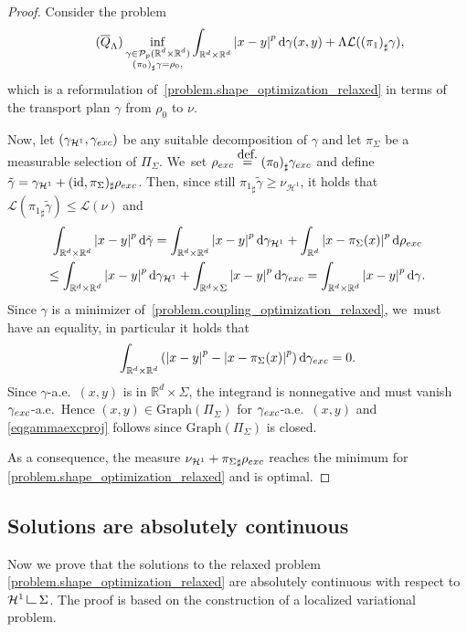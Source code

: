 \documentclass[11pt]{article}
\numberwithin{equation}{section}
\theoremstyle{definition}
\newcommand{\eqdef}{\ensuremath{\stackrel{\mbox{\upshape\tiny def.}}{=}}}
\newcommand\LM[1]{\hbox{\vrule width.5pt \vbox to#1pt{\vfill \hrule width#1pt height.5pt}}}
\newcommand\LL{{\mathchoice {\>\LM7\>}{\>\LM7\>}{\,\LM5\,}{\,\LM{3.35}\,}}}
\newcommand{\mres}{\LL}
\newcommand\cH{\mathcal{H}}
\newcommand{\RR}{\mathbb{R}}
\newcommand{\nuH}{\nu_{\cH^1}}
\newcommand{\rhoexc}{\rho_{\textup{exc}}}
\newcommand{\gammaexc}{\gamma_{\textup{exc}}}
\newcommand{\gammaH}{\gamma_{\cH^1}}
\newcommand\dd{\mathrm{d}}
\newcommand{\abs}[1]{\left\lvert#1\right\rvert}
\begin{document}
\begin{proof}
Consider the problem\vspace*{-3pt}
\begin{align}
\label{problem.coupling_optimization_relaxed}
\tag{$\overline{Q}_\Lambda$}
\inf_{
\substack{
\gamma \in \mathcal{P}_p(\RR^d\times \RR^d)\\
{(\pi_{0})}_\sharp\gamma = \rho_0,
}
}
\int_{{\RR^d\times \RR^d}}\abs{x-y}^p\dd \gamma(x,y) + \Lambda \mathcal{L}({(\pi_{1})}_\sharp\gamma),
\end{align}
which is a reformulation of~\eqref{problem.shape_optimization_relaxed} in
terms of the transport plan $\gamma$ from $\rho_0$ to $\nu$.

Now, let $(\gammaH,\gammaexc)$ be any suitable decomposition of $\gamma$ and let $\pi_\Sigma$ be a measurable selection of $\Pi_\Sigma$. We~set $\rhoexc\eqdef {(\pi_{0})}_\sharp\gammaexc$ and define $\tilde{\gamma} = \gammaH + (\text{id},\pi_\Sigma)_{\sharp}\rhoexc$. Then,
since still ${\pi_1}_\sharp \tilde{\gamma}\ge \nu_{\cH^1}$,
it holds that $\mathcal{L}({\pi_{1}}_\sharp\tilde{\gamma})\leq \mathcal{L}(\nu)$ and
\begin{multline*}
\int_{{\RR^d\times \RR^d}}
\abs{x-y}^p\dd \tilde{\gamma}
= \int_{{\RR^d\times \RR^d}}
\abs{x-y}^p\dd \gammaH
+
\int_{\RR^d}
\abs{x-\pi_{\Sigma}(x)}^p\dd\rhoexc \\
\leq \int_{{\RR^d\times \RR^d}}\abs{x-y}^p\dd \gammaH+ \int_{\RR^d\times \Sigma}\abs{x-y}^p\dd\gammaexc = \int_{{\RR^d\times \RR^d}}\abs{x-y}^p\dd {\gamma}.
\end{multline*}
Since $\gamma$ is a minimizer of~\eqref{problem.coupling_optimization_relaxed}, we~must have an equality, in particular it holds that
\begin{equation*}
\int_{\RR^d\times \RR^d}\left( \abs{x-y}^p-\abs{x-\pi_{\Sigma}(x)}^p\right)\dd\gammaexc = 0.
\end{equation*}
Since $\gamma$-a.e.~$(x,y)$ is in $\RR^d\times \Sigma$, the integrand is nonnegative and must vanish $\gammaexc$-a.e.\ Hence $(x,y) \in \mathrm{Graph}(\Pi_\Sigma)$ for $\gammaexc$-a.e.\ $(x,y)$ and \eqref{eqgammaexcproj} follows since $\mathrm{Graph}(\Pi_\Sigma)$ is closed.

As a consequence, the measure $\nuH + {\pi_{\Sigma}}_\sharp\rhoexc$ reaches the minimum for \eqref{problem.shape_optimization_relaxed} and is optimal.
\end{proof}

\subsection{Solutions are absolutely continuous}
Now we prove
that the solutions to the relaxed problem \eqref{problem.shape_optimization_relaxed} are absolutely continuous with respect to $\cH^1\mres\Sigma$. The proof is based on the construction of a localized variational problem.
\end{document}
